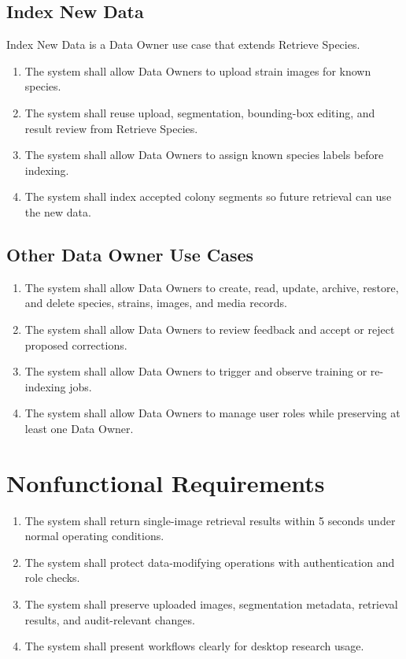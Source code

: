 \documentclass[11pt]{article}
\begin{document}
\subsection{Index New Data}

Index New Data is a Data Owner use case that extends Retrieve Species.

\begin{enumerate}
  \item The system shall allow Data Owners to upload strain images for known species.
  \item The system shall reuse upload, segmentation, bounding-box editing, and result review from Retrieve Species.
  \item The system shall allow Data Owners to assign known species labels before indexing.
  \item The system shall index accepted colony segments so future retrieval can use the new data.
\end{enumerate}

\subsection{Other Data Owner Use Cases}

\begin{enumerate}
  \item The system shall allow Data Owners to create, read, update, archive, restore, and delete species, strains, images, and media records.
  \item The system shall allow Data Owners to review feedback and accept or reject proposed corrections.
  \item The system shall allow Data Owners to trigger and observe training or re-indexing jobs.
  \item The system shall allow Data Owners to manage user roles while preserving at least one Data Owner.
\end{enumerate}

\section{Nonfunctional Requirements}

\begin{enumerate}
  \item The system shall return single-image retrieval results within 5 seconds under normal operating conditions.
  \item The system shall protect data-modifying operations with authentication and role checks.
  \item The system shall preserve uploaded images, segmentation metadata, retrieval results, and audit-relevant changes.
  \item The system shall present workflows clearly for desktop research usage.
\end{enumerate}
\end{document}

